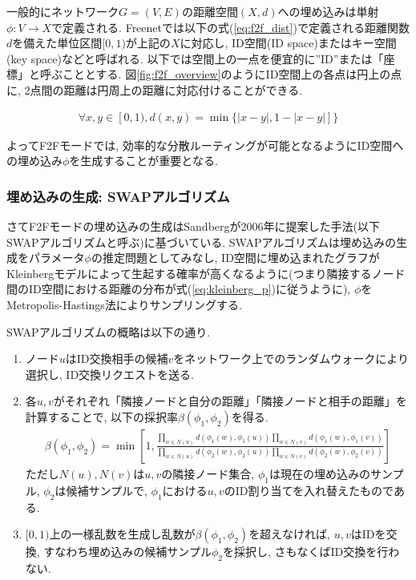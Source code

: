 \documentclass[dvipdfmx]{ampbt}
\begin{document}
   一般的にネットワーク$G=(V,E)$の距離空間$(X,d)$への埋め込みは単射$\phi:V \to X$で定義される\cite{papadimitriou2005conjecture}. Freenetでは以下の式(\ref{eq:f2f_dist})で定義される距離関数$d$を備えた単位区間$[0,1)$が上記の$X$に対応し, ID空間(ID space)またはキー空間(key space)などと呼ばれる. 以下では空間上の一点を便宜的に''ID''または「座標」と呼ぶこととする. 図\ref{fig:f2f_overview}のようにID空間上の各点は円上の点に, 2点間の距離は円周上の距離に対応付けることができる.

   \begin{eqnarray}
    \forall x,y \in [0,1), d(x,y) = \min\{|x-y|, 1 - |x-y|]\} \label{eq:f2f_dist}
   \end{eqnarray}

   よってF2Fモードでは, 効率的な分散ルーティングが可能となるようにID空間への埋め込み$\phi$を生成することが重要となる. 

   \subsubsection{埋め込みの生成: SWAPアルゴリズム}
   さてF2Fモードの埋め込みの生成はSandbergが2006年に提案した手法(以下SWAPアルゴリズムと呼ぶ)に基づいている\cite{sandberg2006distributed}. SWAPアルゴリズムは埋め込みの生成をパラメータ$\phi$の推定問題としてみなし, ID空間に埋め込まれたグラフがKleinbergモデルによって生起する確率が高くなるように(つまり隣接するノード間のID空間における距離の分布が式(\ref{eq:kleinberg_p})に従うように), $\phi$をMetropolis-Hastings法によりサンプリングする.

   SWAPアルゴリズムの概略は以下の通り.
   \begin{enumerate}
    \item ノード$u$はID交換相手の候補$v$をネットワーク上でのランダムウォークにより選択し, ID交換リクエストを送る.
    \item 各$u,v$がそれぞれ「隣接ノードと自分の距離」「隣接ノードと相手の距離」を計算することで, 以下の採択率$\beta(\phi_1, \phi_2)$を得る. 
    \begin{eqnarray}
     \beta(\phi_1, \phi_2)= \min \left[1, \frac{\prod_{w \in N(u)}d(\phi_1(w), \phi_1(u))\prod_{w \in N(v)}d(\phi_1(w), \phi_1(v))}{\prod_{w \in N(u)}d(\phi_2(w), \phi_2(u))\prod_{w \in N(v)}d(\phi_2(w), \phi_2(v))}\right] \label{eq:acceptance}
    \end{eqnarray}
	  ただし$N(u), N(v)$は$u,v$の隣接ノード集合, $\phi_1$は現在の埋め込みのサンプル, $\phi_2$は候補サンプルで, $\phi_1$における$u,v$のID割り当てを入れ替えたものである.
    \item $[0,1)$上の一様乱数を生成し乱数が$\beta(\phi_1, \phi_2)$を超えなければ, $u,v$はIDを交換, すなわち埋め込みの候補サンプル$\phi_2$を採択し, さもなくばID交換を行わない.
   \end{enumerate}
\end{document}
